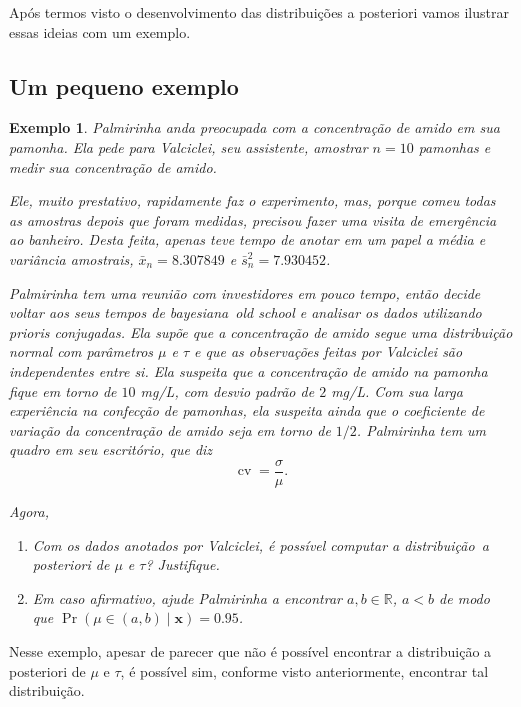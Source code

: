 \documentclass{article}
\newtheorem{example}{Exemplo}
\begin{document}
Após termos visto o desenvolvimento das distribuições a posteriori vamos ilustrar essas ideias com um exemplo.

\subsection*{Um pequeno exemplo}

\begin{example}
    Palmirinha anda preocupada com a concentração de amido em sua pamonha. Ela pede para Valciclei, seu assistente, amostrar $n=10$ pamonhas e medir sua concentração de amido.
    
    Ele, muito prestativo, rapidamente faz o experimento, mas, porque comeu todas as amostras depois que foram medidas, precisou fazer uma visita de emergência ao banheiro. Desta feita, apenas teve tempo de anotar em um papel a média e variância amostrais, $\bar{x}_n =  8.307849$ e $\bar{s}^2_n = 7.930452$.
    
    Palmirinha tem uma reunião com investidores em pouco tempo, então decide voltar aos seus tempos de bayesiana~\textit{old school} e analisar os dados utilizando prioris conjugadas. Ela supõe que a concentração de amido segue uma distribuição normal com parâmetros $\mu$ e $\tau$ e que as observações feitas por Valciclei são independentes entre si. Ela suspeita que a concentração de amido na pamonha fique em torno de $10$ mg/L, com desvio padrão de $2$ mg/L. Com sua larga experiência na confecção de pamonhas, ela suspeita ainda que o coeficiente de variação da concentração de amido seja em torno de $1/2$. Palmirinha tem um quadro em seu escritório, que diz
    \[\operatorname{cv} = \frac{\sigma}{\mu}.\]
    
    Agora, 
    \begin{enumerate}
        \item
            Com os dados anotados por Valciclei, é possível computar a distribuição~\textit{a posteriori} de $\mu$ e $\tau$? Justifique.
            
        \item
            Em caso afirmativo, ajude Palmirinha a encontrar $a, b \in \mathbb{R}$, $a < b$ de modo que $\operatorname{Pr}(\mu \in (a, b) \mid \boldsymbol{x}) = 0.95$.
    \end{enumerate}
\end{example}

Nesse exemplo, apesar de parecer que não é possível encontrar a distribuição a posteriori de $\mu$ e $\tau$, é possível sim, conforme visto anteriormente, encontrar tal distribuição.
\end{document}
